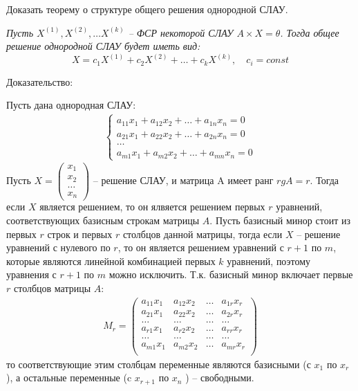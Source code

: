 \begin{question}
  Доказать теорему о структуре общего решения однородной СЛАУ.
\end{question} 
\begin{answer}
  \textit{Пусть $X^{(1)}, X^{(2)}, \ldots X^{(k)}$ -- ФСР некоторой СЛАУ $A \times X = \theta$. Тогда общее решение однородной СЛАУ будет иметь вид: \[
    X = c_1 X^{(1)} + c_2 X^{(2)} + \ldots + c_k X^{(k)}, \quad c_i = const
\] }

  Доказательство:

  Пусть дана однородная СЛАУ:
  \begin{align*}
    \begin{cases}
      a_{11} x_1 + a_{12} x_2 + \ldots + a_{1n} x_{n} = 0 \\
      a_{21} x_1 + a_{22} x_2 + \ldots + a_{2n} x_{n} = 0 \\
      \ldots \\
      a_{m1} x_1 + a_{m2} x_2 + \ldots + a_{mn} x_{n} = 0
    \end{cases} \tag{1}
  \end{align*}
  Пусть $X = \left( \begin{matrix} x_1 \\ x_2 \\ \ldots \\ x_{n} \end{matrix} \right) $ -- решение СЛАУ, и матрица A имеет ранг $rg A = r$. 
  Тогда если $X$ является решением, то он ялвяется решением первых $r$ уравнений, соответствующих базисным строкам матрицы $A$.
  Пусть базисный минор стоит из первых $r$ строк и первых $r$ столбцов данной матрицы, тогда если $X$ -- решение уравнений с нулевого по $r$, то он является решением уравнений с  $r+1$ по $m$, которые являются линейной комбинацией первых  $k$ уравнений, поэтому уравнения с  $r+1$ по $m$ можно исключить.
  Т.к. базисный минор включает первые $r$ столбцов матрицы  $A$:
  \begin{gather*}
    M_r =
    \begin{pmatrix}
      a_{11} x_1 & a_{12} x_2 & \ldots & a_{1r} x_r \\
      a_{21} x_1 & a_{22} x_2 & \ldots & a_{2r} x_r \\
      \ldots & \ldots & \ldots & \ldots \\
      a_{r1} x_1 & a_{r2} x_2 & \ldots & a_{rr} x_r \\
      \ldots & \ldots & \ldots & \ldots \\
      a_{m1} x_1 & a_{m2} x_2 & \ldots & a_{mr} x_r \\
    \end{pmatrix}
  \end{gather*}
  то соответствующие этим столбцам переменные являются базисными (с $x_1$ по $x_{r}$), а остальные переменные (c $x_{r+1}$ по $ x_n$ ) -- свободными.


\end{answer}
